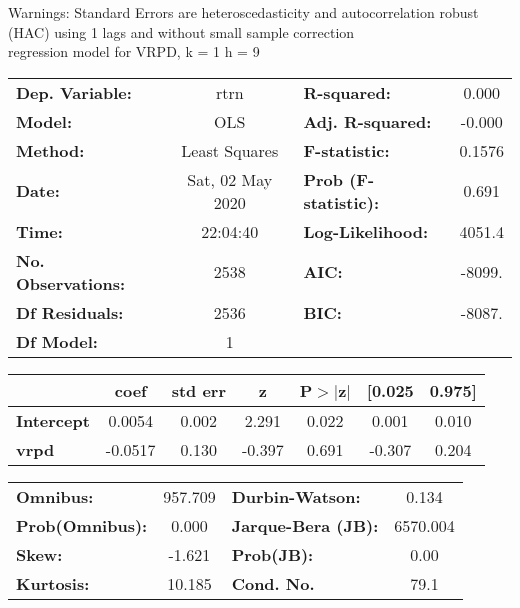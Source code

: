 Warnings: \newline
 [1] Standard Errors are heteroscedasticity and autocorrelation robust (HAC) using 1 lags and without small sample correction\\ 

regression model for VRPD, k = 1 h = 9\begin{center}
\begin{tabular}{lclc}
\toprule
\textbf{Dep. Variable:}    &       rtrn       & \textbf{  R-squared:         } &     0.000   \\
\textbf{Model:}            &       OLS        & \textbf{  Adj. R-squared:    } &    -0.000   \\
\textbf{Method:}           &  Least Squares   & \textbf{  F-statistic:       } &    0.1576   \\
\textbf{Date:}             & Sat, 02 May 2020 & \textbf{  Prob (F-statistic):} &    0.691    \\
\textbf{Time:}             &     22:04:40     & \textbf{  Log-Likelihood:    } &    4051.4   \\
\textbf{No. Observations:} &        2538      & \textbf{  AIC:               } &    -8099.   \\
\textbf{Df Residuals:}     &        2536      & \textbf{  BIC:               } &    -8087.   \\
\textbf{Df Model:}         &           1      & \textbf{                     } &             \\
\bottomrule
\end{tabular}
\begin{tabular}{lcccccc}
                   & \textbf{coef} & \textbf{std err} & \textbf{z} & \textbf{P$> |$z$|$} & \textbf{[0.025} & \textbf{0.975]}  \\
\midrule
\textbf{Intercept} &       0.0054  &        0.002     &     2.291  &         0.022        &        0.001    &        0.010     \\
\textbf{vrpd}      &      -0.0517  &        0.130     &    -0.397  &         0.691        &       -0.307    &        0.204     \\
\bottomrule
\end{tabular}
\begin{tabular}{lclc}
\textbf{Omnibus:}       & 957.709 & \textbf{  Durbin-Watson:     } &    0.134  \\
\textbf{Prob(Omnibus):} &   0.000 & \textbf{  Jarque-Bera (JB):  } & 6570.004  \\
\textbf{Skew:}          &  -1.621 & \textbf{  Prob(JB):          } &     0.00  \\
\textbf{Kurtosis:}      &  10.185 & \textbf{  Cond. No.          } &     79.1  \\
\bottomrule
\end{tabular}
\end{center}


